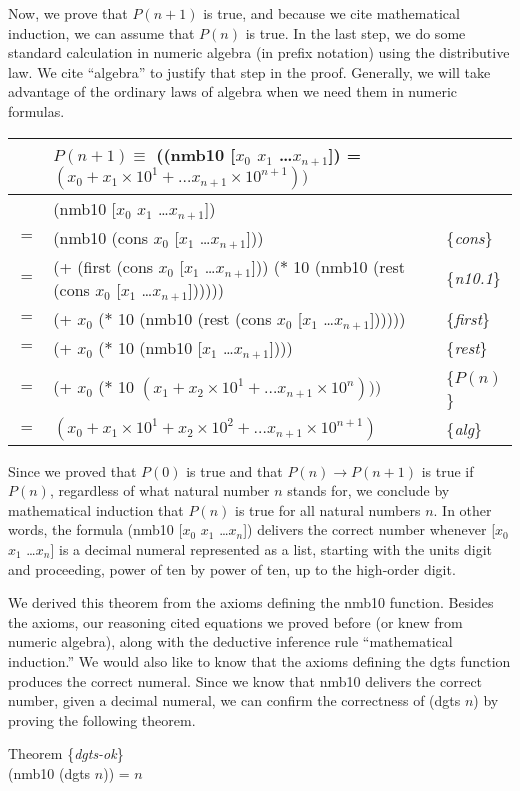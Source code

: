 Now, we prove that $P(n+1)$ is true,
and because we cite mathematical induction,
we can assume that $P(n)$ is true.
In the last step, we do some standard
calculation in numeric algebra (in prefix notation)
using the distributive law.
We cite ``algebra'' to justify that step in the proof.
Generally, we will take advantage of the ordinary
laws of algebra when we need them in numeric formulas.
\begin{center}
\begin{tabular}{lll}
 & $P(n+1) \equiv$
((nmb10 [$x_0$ $x_1$ \dots $x_{n+1}$]) =
$(x_0 + x_1 \times 10^1 +  \dots x_{n+1} \times 10^{n+1}))$ & \\
\hline
    & (nmb10 [$x_0$ $x_1$ \dots $x_{n+1}$])           & \\
$=$ & (nmb10 (cons $x_0$ [$x_1$ \dots $x_{n+1}$]))  & \{\emph{cons}\}\\
$=$ & (+ (first (cons $x_0$ [$x_1$ \dots $x_{n+1}$])) ($*$ 10 (nmb10 (rest (cons $x_0$ [$x_1$ \dots $x_{n+1}$])))))  & \{\emph{n10.1}\} \\
$=$ & (+ $x_0$ ($*$ 10 (nmb10 (rest (cons $x_0$ [$x_1$ \dots $x_{n+1}$])))))  & \{\emph{first}\} \\
$=$ & (+ $x_0$ ($*$ 10 (nmb10 [$x_1$ \dots $x_{n+1}$])))  & \{\emph{rest}\}\\
$=$ & (+ $x_0$ ($*$ 10 $(x_1 + x_2 \times 10^1 + \dots x_{n+1} \times 10^{n})))$  & \{$P(n)$\}\\
$=$ & $(x_0 + x_1 \times 10^1 + x_2 \times 10^2 + \dots x_{n+1} \times 10^{n+1})$  & \{\emph{alg}\} \\
\end{tabular}
\end{center}

Since we proved that $P(0)$ is true and that
$P(n) \rightarrow P(n+1)$ is true if $P(n)$,
regardless of what natural number $n$ stands for,
we conclude by mathematical induction that
$P(n)$ is true for all natural numbers $n$.
In other words, the formula
(nmb10 [$x_0$ $x_1$ \dots $x_{n}$]) delivers the correct
number whenever [$x_0$ $x_1$ \dots $x_{n}$] is a decimal numeral
represented as a list, starting with the units digit
and proceeding, power of ten by power of ten, up to the high-order digit.

We derived this theorem from the axioms defining the nmb10 function.
Besides the axioms, our reasoning cited equations we proved before
(or knew from numeric algebra),
along with the deductive inference rule ``mathematical induction.''
We would also like to know that the axioms defining the dgts function
produces the correct numeral.
Since we know that nmb10 delivers the correct number,
given a decimal numeral, we can confirm the correctness
of (dgts $n$) by proving the following theorem.
\begin{center}
\label{dgts-ok}
Theorem \{\emph{dgts-ok}\} \\
(nmb10 (dgts $n$)) = $n$
\end{center}

